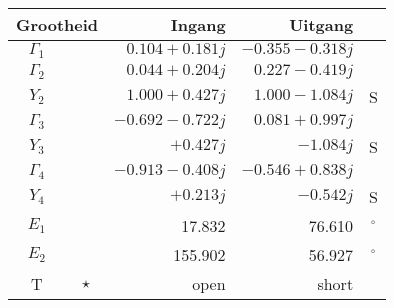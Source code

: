 \begin{tabular}{|cc|r|r|c|} 
\hline \multicolumn{2}{|c|}{\textbf{Grootheid}} & \textbf{Ingang} & \textbf{Uitgang} & \\ 
\hline $\Gamma_1$ & \color{blue}{$\star$} & $0.104 +0.181 j$ & $-0.355 -0.318 j$ &  \\ 
\hline $\Gamma_2$ & \color{green}{$\star$} & $0.044 +0.204 j$ & $0.227 -0.419 j$ &  \\ 
$Y_2$ & \color{green}{$\star$} & $1.000 +0.427 j$ & $1.000 -1.084 j$ & S \\ 
\hline $\Gamma_3$ & \color{cyan}{$\star$} & $-0.692 -0.722 j$ & $0.081 +0.997 j$ &  \\ 
$Y_3$ & \color{cyan}{$\star$} & $+0.427 j$ & $-1.084 j$ & S \\ 
\hline $\Gamma_4$ & \color{magenta}{$\star$} & $-0.913 -0.408 j$ & $-0.546 +0.838 j$ &  \\ 
$Y_4$ & \color{magenta}{$\star$} & $+0.213 j$ & $-0.542 j$ & S \\ 
\hline $E_1$ & \color{blue}{\textbf{--}} & 17.832 & 76.610 & $^{\circ}$ \\ 
\hline $E_2$ & \color{magenta}{\textbf{--}} & 155.902 & 56.927 & $^{\circ}$ \\ 
\hline T & $\star$ & open & short &  \\ 
\hline \end{tabular} 
